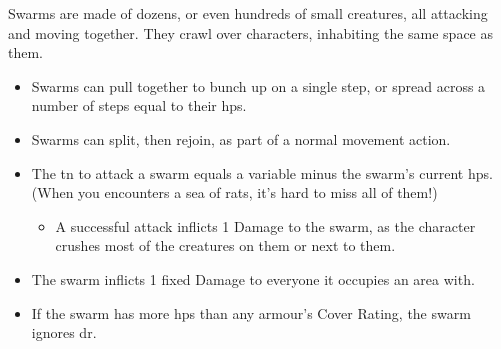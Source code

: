 Swarms are made of dozens, or even hundreds of small creatures, all attacking and moving together.
They crawl over characters, inhabiting the same space as them.

\begin{itemize}
  \item
  Swarms can pull together to bunch up on a single \gls{step}, or spread across a number of \glspl{step} equal to their \glspl{hp}.
  \item
  Swarms can split, then rejoin, as part of a normal movement action.
  \item
  The \gls{tn} to attack a swarm equals a variable minus the swarm's current \glspl{hp}.
  (When you encounters a sea of rats, it's hard to miss all of them!)
  \begin{itemize}
    \item
    A successful attack inflicts 1 Damage to the swarm, as the character crushes most of the creatures on them or next to them.
  \end{itemize}
  \item
  The swarm inflicts 1 fixed Damage to everyone it occupies an area with.
  \item
  If the swarm has more \glspl{hp} than any armour's Cover Rating, the swarm ignores \gls{dr}.
\end{itemize}

